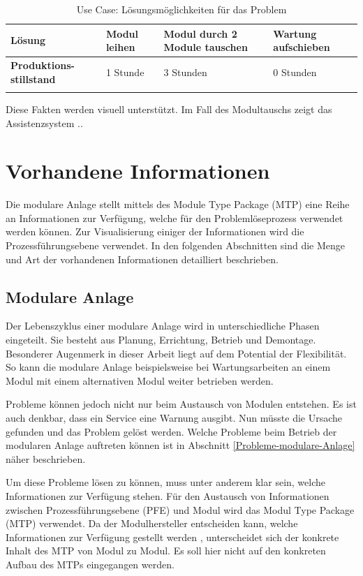 \begin{table}[htbp]
\centering
\begin{tabular}{p{}|p{}|p{}|p{}|}
\textbf{Lösung} & Modul leihen & Modul durch 2 Module tauschen & Wartung aufschieben \\
\hline
\textbf{Produktions-stillstand} & 1 Stunde & 3 Stunden & 0 Stunden \\
\hline
\textbf{} &  &  &  \\
\hline
\end{tabular}
\caption{Use Case: Lösungsmöglichkeiten für das Problem}
\label{tab:UseCase-Lösungen}
\end{table}
Diese Fakten werden visuell unterstützt. Im Fall des Modultauschs zeigt das Assistenzsystem ..

\section{Vorhandene Informationen}
Die modulare Anlage stellt mittels des Module Type Package (MTP) eine Reihe an Informationen zur Verfügung, welche für den Problemlöseprozess verwendet werden können. Zur Visualisierung einiger der Informationen wird die Prozessführungsebene verwendet. In den folgenden Abschnitten sind die Menge und Art der vorhandenen Informationen detailliert beschrieben. 

\subsection{Modulare Anlage}
Der Lebenszyklus einer modulare Anlage wird in unterschiedliche Phasen eingeteilt. Sie besteht aus Planung, Errichtung, Betrieb und Demontage. \cite{Obst2013}  Besonderer Augenmerk in dieser Arbeit liegt auf dem Potential der Flexibilität. So kann die modulare Anlage beispielsweise bei Wartungsarbeiten an einem Modul mit einem alternativen Modul weiter betrieben werden.

Probleme können jedoch nicht nur beim Austausch von Modulen entstehen. Es ist auch denkbar, dass ein Service eine Warnung ausgibt. Nun müsste die Ursache gefunden und das Problem gelöst werden. Welche Probleme beim Betrieb der modularen Anlage auftreten können ist in Abschnitt \ref{Probleme-modulare-Anlage} näher beschrieben.

Um diese Probleme lösen zu können, muss unter anderem klar sein, welche Informationen zur Verfügung stehen. Für den Austausch von Informationen zwischen Prozessführungsebene (PFE) und Modul wird das Modul Type Package (MTP) verwendet. Da der Modulhersteller entscheiden kann, welche Informationen zur Verfügung gestellt werden , unterscheidet sich der konkrete Inhalt des MTP von Modul zu Modul. Es soll hier nicht auf den konkreten Aufbau des MTPs eingegangen werden.

